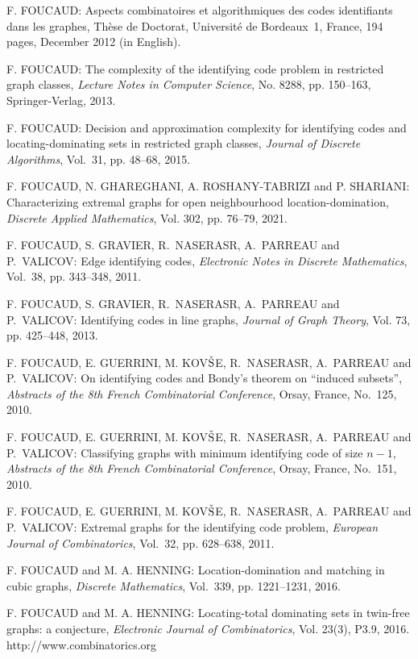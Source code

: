 \begin{thebibliography}{999}
F. FOUCAUD: Aspects combinatoires et algorithmiques des codes identifiants dans les graphes, Th\`ese de Doctorat, Universit\'e de Bordeaux~1, France, 194 pages, December 2012 (in English).

F. FOUCAUD: The complexity of the  identifying code problem in restricted graph classes, {\it Lecture Notes in Computer Science}, No. 8288, pp. 150--163, Springer-Verlag, 2013.

F. FOUCAUD: Decision and approximation complexity for identifying codes and locating-dominating sets in restricted graph classes, {\it Journal of Discrete Algorithms}, Vol.~31, pp. 48--68, 2015.

F. FOUCAUD, N. GHAREGHANI, A. ROSHANY-TABRIZI and P. SHARIANI: Characterizing extremal graphs for open neighbourhood location-domination, {\it Discrete Applied Mathematics}, Vol. 302, pp. 76--79, 2021.

F. FOUCAUD, S. GRAVIER, R.~NASERASR, A.~PARREAU and P.~VALICOV: Edge identifying codes, {\it Electronic Notes in Discrete Mathematics}, Vol.~38, pp. 343--348, 2011. 

F. FOUCAUD, S. GRAVIER, R.~NASERASR, A.~PARREAU and P.~VALICOV: Identifying codes in line graphs, {\it Journal of Graph Theory}, Vol. 73, pp. 425--448, 2013.

F. FOUCAUD, E. GUERRINI, M. KOV$\check{\rm S}$E, R.~NASERASR, A.~PARREAU and P.~VALICOV: On identifying codes and Bondy's theorem on ``induced subsets'', {\it Abstracts of the 8th French Combinatorial Conference}, Orsay, France, No.~125, 2010.

F. FOUCAUD, E. GUERRINI, M. KOV$\check{\rm S}$E, R.~NASERASR, A.~PARREAU and P.~VALICOV: Classifying graphs with minimum identifying code of size $n-1$, {\it Abstracts of the 8th French Combinatorial Conference}, Orsay, France, No.~151, 2010.

F. FOUCAUD, E. GUERRINI, M. KOV$\check{\rm S}$E, R.~NASERASR, A.~PARREAU and P.~VALICOV: Extremal graphs for the identifying code problem, {\it European Journal of Combinatorics}, Vol.~32, pp. 628--638, 2011.

F. FOUCAUD and M. A. HENNING: Location-domination and matching in cubic graphs, {\it Discrete Mathematics}, Vol.~339, pp. 1221--1231, 2016.

F. FOUCAUD and M. A. HENNING: Locating-total dominating sets in twin-free graphs: a conjecture, {\it Electronic Journal of Combinatorics}, Vol. 23(3), P3.9, 2016.\\
http://www.combinatorics.org


\end{thebibliography}
